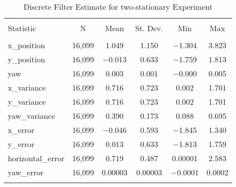 
\begin{table}[h] \centering 
  \caption{Discrete Filter Estimate for two-stationary Experiment} 
  \label{tab:two_stationary_discrete_summary} 
\begin{tabular}{@{\extracolsep{5pt}}lccccc} 
\\[-1.8ex]\hline 
\hline \\[-1.8ex] 
Statistic & \multicolumn{1}{c}{N} & \multicolumn{1}{c}{Mean} & \multicolumn{1}{c}{St. Dev.} & \multicolumn{1}{c}{Min} & \multicolumn{1}{c}{Max} \\ 
\hline \\[-1.8ex] 
x\_position & 16,099 & \num{1.049} & \num{1.150} & $-$1.304 & \num{3.823} \\ 
y\_position & 16,099 & $-$0.013 & \num{0.633} & $-$1.759 & \num{1.813} \\ 
yaw & 16,099 & \num{0.003} & \num{0.001} & $-$0.000 & \num{0.005} \\ 
x\_variance & 16,099 & \num{0.716} & \num{0.723} & \num{0.002} & \num{1.701} \\ 
y\_variance & 16,099 & \num{0.716} & \num{0.723} & \num{0.002} & \num{1.701} \\ 
yaw\_variance & 16,099 & \num{0.390} & \num{0.173} & \num{0.088} & \num{0.695} \\ 
x\_error & 16,099 & $-$0.046 & \num{0.593} & $-$1.845 & \num{1.340} \\ 
y\_error & 16,099 & \num{0.013} & \num{0.633} & $-$1.813 & \num{1.759} \\ 
horizontal\_error & 16,099 & \num{0.719} & \num{0.487} & \num{0.00001} & \num{2.583} \\ 
yaw\_error & 16,099 & \num{0.00003} & \num{0.00003} & $-$0.0001 & \num{0.0002} \\ 
\hline \\[-1.8ex] 
\end{tabular} 
\end{table} 

